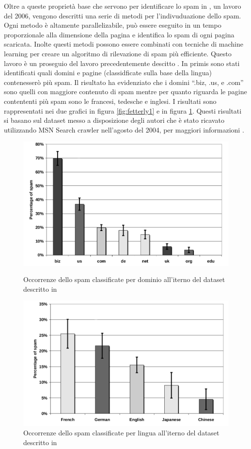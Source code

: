 Oltre a queste proprietà base che servono per identificare lo spam in \cite{Ntoulas:2006:DSW:1135777.1135794}, un lavoro del 2006, vengono descritti una serie di metodi per l'indivuduazione dello spam. Ogni metodo è altamente parallelizabile, può essere eseguito in un tempo proporzionale alla dimensione della pagina e identifica lo spam di ogni pagina scaricata. Inolte questi metodi possono essere combinati con tecniche di machine learning per creare un algoritmo di rilevazione di spam più efficiente. Questo lavoro è un proseguio del lavoro precedentemente descitto \cite{Fetterly:2004:SDS:1017074.1017077}. In primis sono stati identificati quali domini e pagine (classidficate sulla base della lingua) contenesserò più spam. Il risultato ha evidenziato che i domini ``.biz, .us, e .com'' sono quelli con maggiore contenuto di spam mentre per quanto riguarda le pagine contententi più spam sono le francesi, tedesche e inglesi. I risultati sono rappresentati nei due grafici in figura \ref{fig:fetterly1} e in figura 
\ref{fig:fetterly2}. Questi risultati si basano sul dataset messo a disposizione degli autori che è stato ricavato utilizzando MSN Search crawler nell'agosto del 2004, per maggiori informazioni \cite{Ntoulas:2006:DSW:1135777.1135794}.
\begin{figure}[htbp]
\centering
\includegraphics[width=12cm]{immagini/fetterly/fetterly1}
\caption{Occorrenze dello spam classificate per dominio all'iterno del dataset descritto in \cite{Ntoulas:2006:DSW:1135777.1135794}}
\label{fig:fetterly1}
\includegraphics[width=12cm]{immagini/fetterly/fetterly2}
\caption{Occorrenze dello spam classificate per lingua all'iterno del dataset descritto in \cite{Ntoulas:2006:DSW:1135777.1135794}}
\label{fig:fetterly2}
\end{figure}

